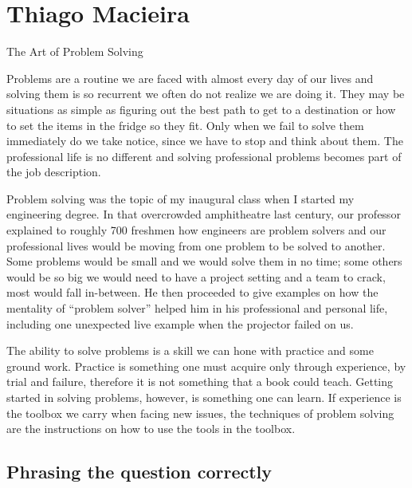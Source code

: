 
\chapter{Thiago Macieira}{The Art of Problem Solving}

Problems are a routine we are faced with almost every day of our lives and
solving them is so recurrent we often do not realize we are doing it. They may
be situations as simple as figuring out the best path to get to a destination or
how to set the items in the fridge so they fit. Only when we fail to solve them
immediately do we take notice, since we have to stop and think about them. The
professional life is no different and solving professional problems becomes part
of the job description.

Problem solving was the topic of my inaugural class when I started my
engineering degree. In that overcrowded amphitheatre last century, our professor
explained to roughly 700 freshmen how engineers are problem solvers and our
professional lives would be moving from one problem to be solved to another.
Some problems would be small and we would solve them in no time; some others
would be so big we would need to have a project setting and a team to crack,
most would fall in-between. He then proceeded to give examples on how the
mentality of ``problem solver'' helped him in his professional and personal
life, including one unexpected live example when the projector failed on us.

The ability to solve problems is a skill we can hone with practice and some
ground work. Practice is something one must acquire only through experience, by
trial and failure, therefore it is not something that a book could teach.
Getting started in solving problems, however, is something one can learn. If
experience is the toolbox we carry when facing new issues, the techniques of
problem solving are the instructions on how to use the tools in the toolbox.

\section*{Phrasing the question correctly}


